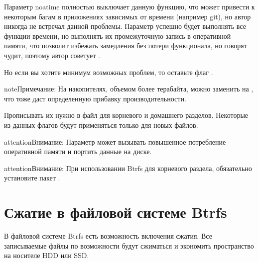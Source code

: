 \documentclass[letterpaper,10pt,russian,openany]{sphinxmanual}
\begin{document}
\sphinxAtStartPar
Параметр noatime полностью выключает данную функцию, что может привести к некоторым багам в приложениях зависимых от времени (например git),
но автор никогда не встречал данной проблемы.
Параметр  успешно будет выполнять все функции времени, но выполнять их промежуточную запись в оперативной памяти,
что позволит избежать замедления без потери функционала, но говорят  чудит, поэтому автор советует .

\sphinxAtStartPar
Но если вы хотите минимум возможных проблем, то оставьте флаг .

\begin{sphinxadmonition}{note}{Примечание:}
\sphinxAtStartPar
На накопителях, объемом более терабайта,  можно заменить на , что тоже даст определенную прибавку производительности.
\end{sphinxadmonition}

\sphinxAtStartPar
Прописывать их нужно в файл  для корневого и домашнего разделов.
Некоторые из данных флагов будут применяться только для новых файлов.

\noindent{}

\begin{sphinxadmonition}{attention}{Внимание:}
\sphinxAtStartPar
Параметр  может вызывать повышенное потребление оперативной памяти и портить данные на диске.
\end{sphinxadmonition}

\begin{sphinxadmonition}{attention}{Внимание:}
\sphinxAtStartPar
При использовании Btrfs для корневого раздела, обязательно установите пакет .
\end{sphinxadmonition}

\ignorespaces 

\section{Сжатие в файловой системе Btrfs}
\label{\detokenize{source/file-systems:btrfs}}\label{\detokenize{source/file-systems:btrfs-comperssion}}\label{\detokenize{source/file-systems:index-2}}
\sphinxAtStartPar
В файловой системе Btrfs есть возможность включения сжатия. Все записываемые файлы по возможности будут сжиматься и экономить пространство на носителе HDD или SSD.
\end{document}

